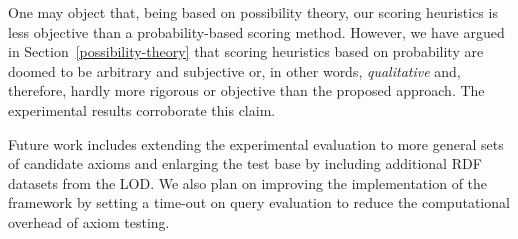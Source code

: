\documentclass{llncs}
\begin{document}
One may object that, being based on possibility theory, our scoring heuristics
is less objective than a probability-based scoring method. However, we have argued
in Section~\ref{possibility-theory} that scoring heuristics based on probability are doomed
to be arbitrary and subjective or, in other words, \emph{qualitative}
and, therefore, hardly more rigorous or objective than the proposed approach.
The experimental results corroborate this claim.

Future work includes extending the experimental evaluation to more general sets
of candidate axioms and enlarging the test base by including additional RDF datasets
from the LOD.
We also plan on improving the implementation of the framework by setting a time-out
on query evaluation to reduce the computational overhead of axiom testing.



\end{document}
